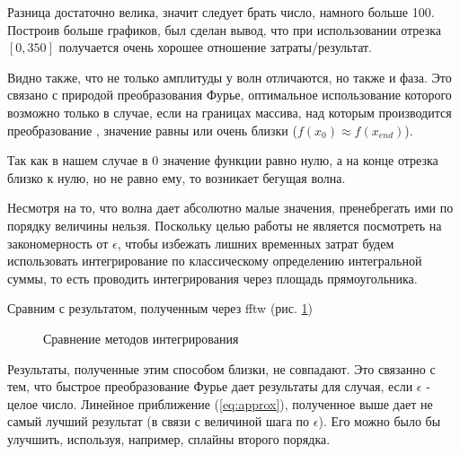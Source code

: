 \documentclass[%
bachelor,    %
natbib,      %
subf,        %
href,        %
colorlinks,  %
]{disser}
\begin{document}
Разница достаточно велика, значит следует брать число, намного больше 100. Построив больше графиков, был сделан вывод, что при использовании отрезка $[0, 350]$ получается очень хорошее отношение затраты/результат.

Видно также, что не только амплитуды у волн отличаются, но также и фаза. Это связано с природой преобразования Фурье, оптимальное использование которого возможно только в случае, если на границах массива, над которым производится преобразование , значение равны или очень близки ($f(x_0) \approx f(x_{end})$).

Так как в нашем случае в 0 значение функции равно нулю, а на конце отрезка близко к нулю, но не равно ему, то возникает бегущая волна.

Несмотря на то, что волна дает абсолютно малые значения, пренебрегать ими по порядку величины нельзя. Поскольку целью работы не является посмотреть на закономерность от $\epsilon$, чтобы избежать лишних временных затрат будем использовать интегрирование по классическому определению интегральной суммы, то есть проводить интегрирования через площадь прямоугольника.\cite{nrc}

Сравним с результатом, полученным через fftw (рис. \ref{ris:fftw_compare_no_fftw2})

\begin{figure}[h]
	\caption{Сравнение методов интегрирования}
	\label{ris:fftw_compare_no_fftw2}
\end{figure}

Результаты, полученные этим способом близки, не совпадают. Это связанно с тем, что быстрое преобразование Фурье дает результаты для случая, если $\epsilon$ - целое число. Линейное приближение (\ref{eq:approx}), полученное выше дает не самый лучший результат (в связи с величиной шага по $\epsilon$). Его можно было бы улучшить, используя, например, сплайны второго порядка.
\end{document}
